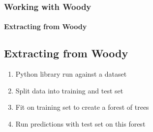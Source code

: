 \documentclass[12pt,t]{beamer}
\begin{document}
\begin{frame}
  \frametitle{Working with Woody}
  \framesubtitle{Extracting from Woody}
\subsection{Extracting from Woody}

\begin{enumerate}
  \item Python library run against a dataset
  \item Split data into training and test set
  \item Fit on training set to create a forest of trees
  \item Run predictions with test set on this forest
\end{enumerate}

\end{frame}
\end{document}
